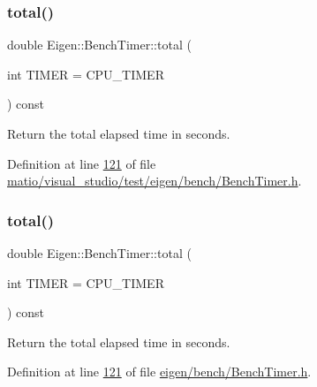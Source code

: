 \subsubsection{\texorpdfstring{total()}{total()}\hspace{0.1cm}{\footnotesize\ttfamily [1/2]}}
{\footnotesize\ttfamily double Eigen\+::\+Bench\+Timer\+::total (\begin{DoxyParamCaption}\item[{int}]{T\+I\+M\+ER = {\ttfamily CPU\+\_\+TIMER} }\end{DoxyParamCaption}) const\hspace{0.3cm}{\ttfamily [inline]}}

Return the total elapsed time in seconds. 

Definition at line \hyperlink{matio_2visual__studio_2test_2eigen_2bench_2_bench_timer_8h_source_l00121}{121} of file \hyperlink{matio_2visual__studio_2test_2eigen_2bench_2_bench_timer_8h_source}{matio/visual\+\_\+studio/test/eigen/bench/\+Bench\+Timer.\+h}.

\mbox{\label{class_eigen_1_1_bench_timer_af341aa613dba2d4a3d167093197e4e7a}} 
\subsubsection{\texorpdfstring{total()}{total()}\hspace{0.1cm}{\footnotesize\ttfamily [2/2]}}
{\footnotesize\ttfamily double Eigen\+::\+Bench\+Timer\+::total (\begin{DoxyParamCaption}\item[{int}]{T\+I\+M\+ER = {\ttfamily CPU\+\_\+TIMER} }\end{DoxyParamCaption}) const\hspace{0.3cm}{\ttfamily [inline]}}

Return the total elapsed time in seconds. 

Definition at line \hyperlink{eigen_2bench_2_bench_timer_8h_source_l00121}{121} of file \hyperlink{eigen_2bench_2_bench_timer_8h_source}{eigen/bench/\+Bench\+Timer.\+h}.

\mbox{\label{class_eigen_1_1_bench_timer_a26760f963ed8b64c126159bfea57735e}} 
